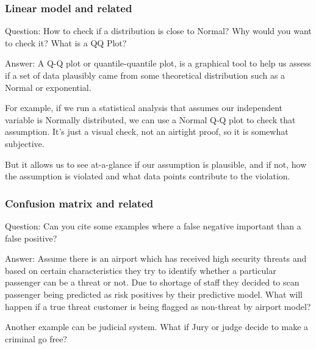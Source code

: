 \documentclass[11pt]{beamer}
\begin{document}
\begin{frame}
\frametitle{Linear model and related}
\begin{block}{Question:}
	How to check if a distribution is close to Normal? Why would you want to check it? What is a QQ Plot?
\end{block}
\begin{block}{Answer:}
	A Q-Q plot or quantile-quantile plot, is a graphical tool to help us assess if a set of data plausibly came from some theoretical distribution such as a Normal or exponential. 
	
	For example, if we run a statistical analysis that assumes our independent variable is Normally distributed, we can use a Normal Q-Q plot to check that assumption. It’s just a visual check, not an airtight proof, so it is somewhat subjective. 
	
	But it allows us to see at-a-glance if our assumption is plausible, and if not, how the assumption is violated and what data points contribute to the violation.
\end{block}
\end{frame}

\begin{frame}
\frametitle{Confusion matrix and related}
\begin{block}{Question:}
	Can you cite some examples where a false negative important than a false positive?
\end{block}
\begin{block}{Answer:}
	Assume there is an airport which has received high security threats and based on certain characteristics they try to identify whether a particular passenger can be a threat or not. Due to shortage of staff they decided to scan passenger being predicted as risk positives by their predictive model.
	What will happen if a true threat customer is being flagged as non-threat by airport model?
	
	Another example can be judicial system. What if Jury or judge decide to make a criminal go free?
\end{block}
\end{frame}
\end{document}
